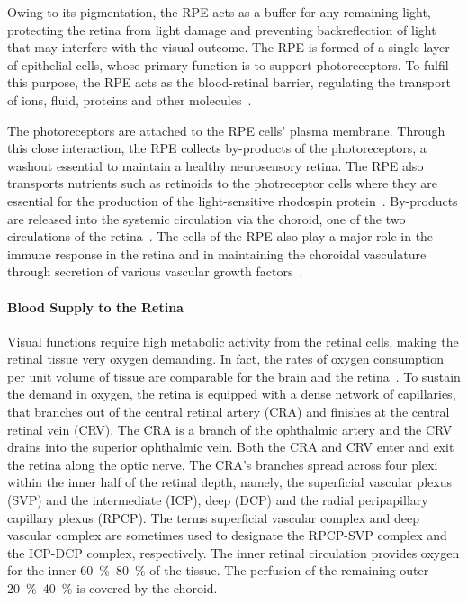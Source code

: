 \documentclass{article}
\begin{document}
Owing to its pigmentation, the RPE acts as a buffer for any remaining light, protecting the retina from light damage and preventing backreflection of light that may interfere with the visual outcome.
The RPE is formed of a single layer of epithelial cells, whose primary function is to support photoreceptors.
To fulfil this purpose, the RPE acts as the blood-retinal barrier, regulating the transport of ions, fluid, proteins and other molecules~\cite{Boulton_2001}.

The photoreceptors are attached to the RPE cells' plasma membrane.
Through this close interaction, the RPE collects by-products of the photoreceptors, a washout essential to maintain a healthy neurosensory retina.
The RPE also transports nutrients such as retinoids to the photreceptor cells where they are essential for the production of the light-sensitive rhodospin protein~\cite{Boulton_2001}.
By-products are released into the systemic circulation via the choroid, one of the two circulations of the retina~\cite{Boulton_2001}.
The cells of the RPE also play a major role in the immune response in the retina and in maintaining the choroidal vasculature through secretion of various vascular growth factors~\cite{Boulton_2001,Detrick_2020}.

\paragraph*{Blood Supply to the Retina}

Visual functions require high metabolic activity from the retinal cells, making the retinal tissue very oxygen demanding.
In fact, the rates of oxygen consumption per unit volume of tissue are comparable for the brain and the retina~\cite{Medrano_1995}.
To sustain the demand in oxygen, the retina is equipped with a dense network of capillaries, that branches out of the central retinal artery (CRA) and finishes at the central retinal vein (CRV).
The CRA is a branch of the ophthalmic artery and the CRV drains into the superior ophthalmic vein.
Both the CRA and CRV enter and exit the retina along the optic nerve.
The CRA's branches spread across four plexi within the inner half of the retinal depth, namely, the superficial vascular plexus (SVP) and the intermediate (ICP), deep (DCP) and the radial peripapillary capillary plexus (RPCP).
The terms superficial vascular complex and deep vascular complex are sometimes used to designate the RPCP-SVP complex and the ICP-DCP complex, respectively.
The inner retinal circulation provides oxygen for the inner \SIrange{60}{80}{\percent} of the tissue.
The perfusion of the remaining outer \SIrange{20}{40}{\percent} is covered by the choroid.
\end{document}
